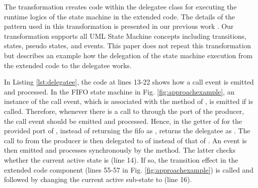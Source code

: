 \noindent
{} 
The transformation creates code within the delegatee class for executing the runtime logics of the state machine in the extended code.
The details of the pattern used in this transformation is presented in our previous work \cite{fullusm}.
Our transformation supports all UML State Machine concepts including transitions, states, pseudo states, and events.
This paper does not repeat this transformation but describes an example how the delegation of the state machine execution from the extended code to the delegatee works.


\begin{minipage}{0.95\columnwidth}
	
\end{minipage}

In Listing \ref{lst:delegatee}, the code at lines 13-22 shows how a  call event is emitted and processed.
In the FIFO state machine in Fig. \ref{fig:approachexample}, an instance of the  call event, which is associated with the  method of , is emitted if  is called.
Therefore, whenever there is a call to  through the  port of the producer, the call event should be emitted and processed.
Hence, in the getter of  for the  provided port of , instead of returning the fifo as ,  returns the delegatee as .
The call to  from the producer is then delegated to  of  instead of that of .
An event is then emitted and processes synchronously by the  method.
The latter checks whether the current active state is  (line 14).
If so, the  transition effect in the extended code component (lines 55-57 in Fig. \ref{fig:approachexample}) is called and followed by changing the current active sub-state to  (line 16).   




 

